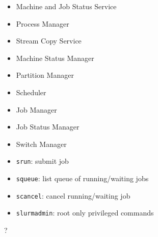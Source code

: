 \documentclass[letter,landscape]{seminar}
\begin{document}
\begin{slide}
\begin{center}
\end{center}
\end{slide}


\begin{slide}
  \begin{itemize}
    \item{Machine and Job Status Service}
    \item{Process Manager}
    \item{Stream Copy Service}
  \end{itemize}
\end{slide}

\begin{slide}
  \begin{itemize}
    \item{Machine Status Manager}
    \item{Partition Manager}
    \item{Scheduler}
    \item{Job Manager}
    \item{Job Status Manager}
    \item{Switch Manager}
  \end{itemize}
\end{slide}

\begin{slide}
  \begin{itemize}
    \item{{\tt srun}: submit job}
    \item{{\tt squeue}: list queue of running/waiting jobs}
    \item{{\tt scancel}: cancel running/waiting job}
    \item{{\tt slurmadmin}: root only privileged commands}
  \end{itemize}
\end{slide}


\begin{slide}
  \begin{center}?
  \end{center}
\end{slide}
\end{document}
